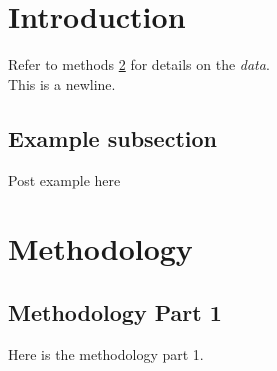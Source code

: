 \documentclass[12pt]{article}
\begin{document}
\begin{abstract}
My abstract
\end{abstract}

\section{Introduction} \label{sec:introduction}
Refer to methods \ref{sec:methodology} 
for details   on the \textit{data}. \\
This is a newline.



\subsection{Example subsection}
Post example here

\appendix
\section{Methodology} \label{sec:methodology}

\subsection{Methodology Part 1} 
Here is the methodology part 1. \cite[Hinton et al. 2006]{Hinton06}


\end{document}
